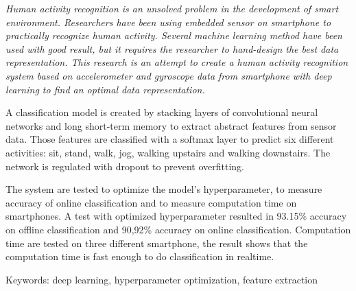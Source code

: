 \begin{abstracteng}
    \itshape
    Human activity recognition is an unsolved problem in the development of smart environment. Researchers have been using embedded sensor on smartphone to practically recognize human activity. Several machine learning method have been used with good result, but it requires the researcher to hand-design the best data representation. This research is an attempt to create a human activity recognition system based on accelerometer and gyroscope data from smartphone with deep learning to find an optimal data representation.

    A classification model is created by stacking layers of convolutional neural networks and long short-term memory to extract abstract features from sensor data. Those features are classified with a softmax layer to predict six different activities: sit, stand, walk, jog, walking upstairs and walking downstairs. The network is regulated with dropout to prevent overfitting.

    The system are tested to optimize the model's hyperparameter, to measure accuracy of online classification and to measure computation time on smartphones. A test with optimized hyperparameter resulted in 93.15\% accuracy on offline classification and 90,92\% accuracy on online classification. Computation time are tested on three different smartphone, the result shows that the computation time is fast enough to do classification in realtime.

    \bigskip
    Keywords: deep learning, hyperparameter optimization, feature extraction
\end{abstracteng}
